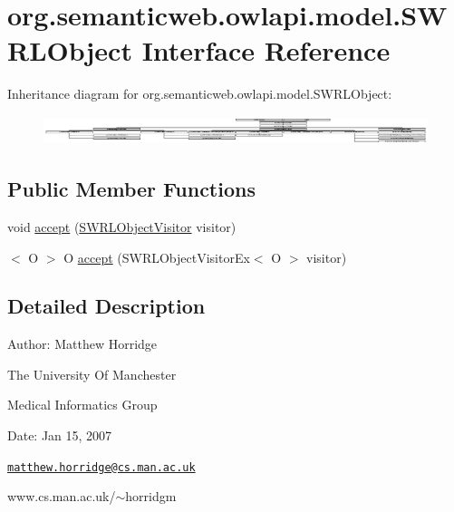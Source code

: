 \hypertarget{interfaceorg_1_1semanticweb_1_1owlapi_1_1model_1_1_s_w_r_l_object}{\section{org.\-semanticweb.\-owlapi.\-model.\-S\-W\-R\-L\-Object Interface Reference}
\label{interfaceorg_1_1semanticweb_1_1owlapi_1_1model_1_1_s_w_r_l_object}
}
Inheritance diagram for org.\-semanticweb.\-owlapi.\-model.\-S\-W\-R\-L\-Object\-:\begin{figure}[H]
\begin{center}
\leavevmode
\includegraphics[height=0.852359cm]{interfaceorg_1_1semanticweb_1_1owlapi_1_1model_1_1_s_w_r_l_object}
\end{center}
\end{figure}
\subsection*{Public Member Functions}
\begin{DoxyCompactItemize}
\item 
void \hyperlink{interfaceorg_1_1semanticweb_1_1owlapi_1_1model_1_1_s_w_r_l_object_a64f298e9fb6ba83e6caa8f94f09a1c76}{accept} (\hyperlink{interfaceorg_1_1semanticweb_1_1owlapi_1_1model_1_1_s_w_r_l_object_visitor}{S\-W\-R\-L\-Object\-Visitor} visitor)
\item 
$<$ O $>$ O \hyperlink{interfaceorg_1_1semanticweb_1_1owlapi_1_1model_1_1_s_w_r_l_object_a350aaf301c54a4032bac5abe72754a76}{accept} (S\-W\-R\-L\-Object\-Visitor\-Ex$<$ O $>$ visitor)
\end{DoxyCompactItemize}


\subsection{Detailed Description}
Author\-: Matthew Horridge\par
 The University Of Manchester\par
 Medical Informatics Group\par
 Date\-: Jan 15, 2007\par
\par
 

\href{mailto:matthew.horridge@cs.man.ac.uk}{\tt matthew.\-horridge@cs.\-man.\-ac.\-uk}\par
 www.\-cs.\-man.\-ac.\-uk/$\sim$horridgm\par
\par
 

